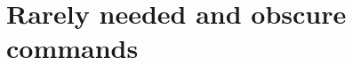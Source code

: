 \documentclass{book}
\begin{document}






\section{Rarely needed and obscure commands}











\appendix








\end{document}
